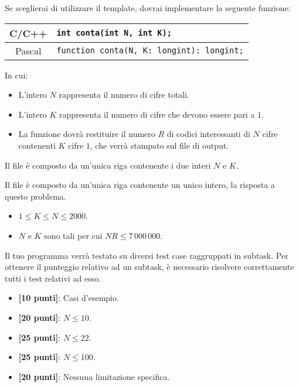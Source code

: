 Se sceglierai di utilizzare il template, dovrai implementare la seguente funzione:
\begin{center}\begin{tabularx}{\textwidth}{|c|X|}
\hline
C/C++  & \verb|int conta(int N, int K);|\\
\hline
Pascal & \verb|function conta(N, K: longint): longint;|\\
\hline
\end{tabularx}\end{center}
In cui:
\begin{itemize}[nolistsep]
  \item L'intero $N$ rappresenta il numero di cifre totali.
  \item L'intero $K$ rappresenta il numero di cifre che devono essere pari a $1$.
  \item La funzione dovrà restituire il numero $R$ di codici interessanti di $N$ cifre contenenti $K$ cifre $1$, che verrà stampato sul file di output.
\end{itemize}

\InputFile
Il file  è composto da un'unica riga contenente i due interi $N$ e $K$.

\OutputFile
Il file \outputfile{} è composto da un'unica riga contenente un unico intero, la risposta a questo problema.

\Constraints
\begin{itemize}[nolistsep, itemsep=2mm]
	\item $1 \le K \le N \le 2000$.
	\item $N$ e $K$ sono tali per cui $NR \le 7\,000\,000$.
\end{itemize}

\Scoring
Il tuo programma verrà testato su diversi test case raggruppati in subtask.
Per ottenere il punteggio relativo ad un subtask, è necessario risolvere
correttamente tutti i test relativi ad esso.

\begin{itemize}[nolistsep,itemsep=2mm]
  \item \textbf{ [10 punti]}: Casi d'esempio.
  \item \textbf{ [20 punti]}: $N \leq 10$.
  \item \textbf{ [25 punti]}: $N \leq 22$.
  \item \textbf{ [25 punti]}: $N \leq 100$.
  \item \textbf{ [20 punti]}: Nessuna limitazione specifica.
\end{itemize}

